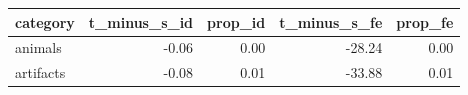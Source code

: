 \begin{table}[ht]
\centering
\begin{tabular}{lrrrr}
  \hline
category & t\_minus\_s\_id & prop\_id & t\_minus\_s\_fe & prop\_fe \\ 
  \hline
animals & -0.06 & 0.00 & -28.24 & 0.00 \\ 
  artifacts & -0.08 & 0.01 & -33.88 & 0.01 \\ 
   \hline
\end{tabular}
\end{table}
